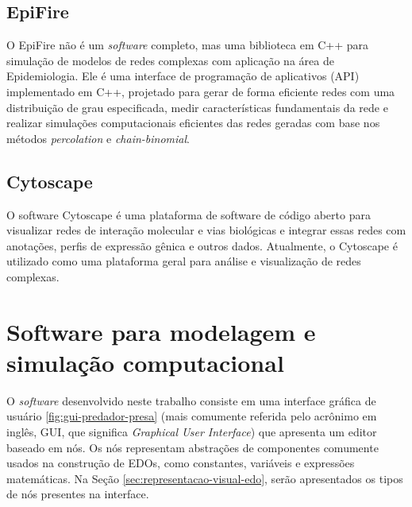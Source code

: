 \documentclass[
	12pt,				%
	openright,			%
	oneside,			%
	a4paper,			%
	main=brazil,
	english,			%
	]{ufsj-abntex2}
\begin{document}
\section{EpiFire}

O EpiFire \cite{epifire} não é um \textit{software} completo, mas uma biblioteca em C++ para simulação de modelos de redes complexas com aplicação na área de Epidemiologia. Ele é uma interface de programação de aplicativos (API) implementado em C++, projetado para gerar de forma eficiente redes com uma distribuição de grau especificada, medir características fundamentais da rede e realizar simulações computacionais eficientes das redes geradas com base nos métodos \textit{percolation} e \textit{chain-binomial}. 

\section{Cytoscape}

O software Cytoscape \cite{shannon2003cytoscape} é uma plataforma de software de código aberto para visualizar redes de interação molecular e vias biológicas e integrar essas redes com anotações, perfis de expressão gênica e outros dados. Atualmente, o Cytoscape é utilizado como uma plataforma geral para análise e visualização de redes complexas. 



\chapter{Software para modelagem e simulação computacional}
\label{chap:metodologia}
\label{chap:software-para-modelagem}

O \textit{software} desenvolvido neste trabalho consiste em uma interface gráfica de usuário \ref{fig:gui-predador-presa} (mais comumente referida pelo acrônimo em inglês, GUI, que significa \textit{Graphical User Interface}) que apresenta um editor baseado em nós. Os nós representam abstrações de componentes comumente usados na construção de EDOs, como constantes, variáveis e expressões matemáticas. Na Seção \ref{sec:representacao-visual-edo}, serão apresentados os tipos de nós presentes na interface.
\end{document}
